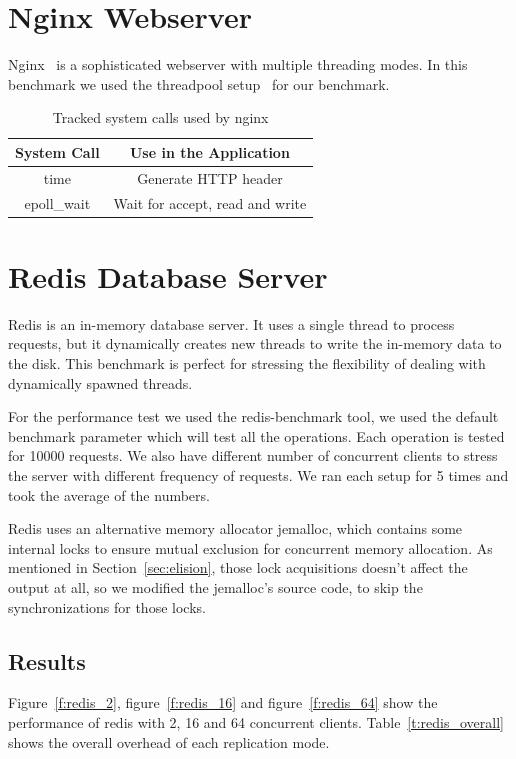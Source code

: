 \section{Nginx Webserver}
Nginx~\cite{reese2008nginx} is a sophisticated webserver with multiple threading modes. In this benchmark we used the threadpool setup~\cite{nginxthreadpool} for our benchmark.

\begin{table}
\caption{Tracked system calls used by nginx}
\begin{center}
 \begin{tabular}{c | c }
System Call & Use in the Application\\ \hline
 time & Generate HTTP header\\ \hline
 epoll\_wait & Wait for accept, read and write
 \end{tabular}
\end{center}
\label{t:nginx_syscall}
\end{table}

\section{Redis Database Server}
Redis is an in-memory database server. It uses a single thread to process requests, but it dynamically creates new threads to write the in-memory data to the disk. This benchmark is perfect for stressing the flexibility of dealing with dynamically spawned threads.

For the performance test we used the redis-benchmark tool, we used the default benchmark parameter which will test all the operations. Each operation is tested for 10000 requests. We also have different number of concurrent clients to stress the server with different frequency of requests. We ran each setup for 5 times and took the average of the numbers.

Redis uses an alternative memory allocator jemalloc, which contains some internal locks to ensure mutual exclusion for concurrent memory allocation. As mentioned in Section~\ref{sec:elision}, those lock acquisitions doesn't affect the output at all, so we modified the jemalloc's source code, to skip the synchronizations for those locks.

\subsection{Results}
Figure~\ref{f:redis_2}, figure~\ref{f:redis_16} and figure~\ref{f:redis_64} show the  performance of redis with 2, 16 and 64 concurrent clients. Table~\ref{t:redis_overall} shows the overall overhead of each replication mode. 

